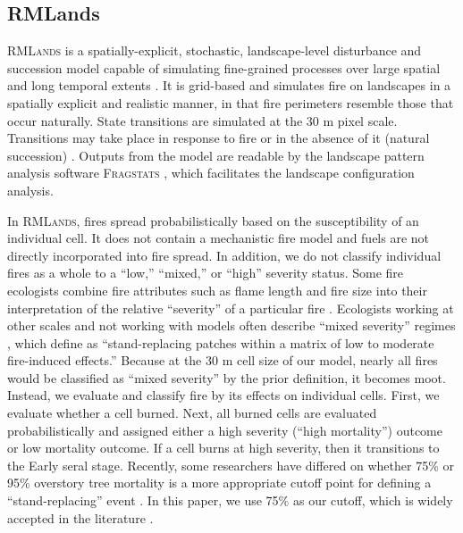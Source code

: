 \subsection{RMLands}

\textsc{RMLands} is a spatially-explicit, stochastic, landscape-level disturbance and succession model capable of simulating fine-grained processes over large spatial and long temporal extents \citep{McGarigal2005}. It is grid-based and simulates fire on landscapes in a spatially explicit and realistic manner, in that fire perimeters resemble those that occur naturally. State transitions are simulated at the 30 m pixel scale. Transitions may take place in response to fire or in the absence of it (natural succession) \citep{McGarigal2012}. Outputs from the model are readable by the landscape pattern analysis software \textsc{Fragstats} \citep{Fragstats2012}, which facilitates the landscape configuration analysis.

In \textsc{RMLands}, fires spread probabilistically based on the susceptibility of an individual cell. It does not contain a mechanistic fire model and fuels are not directly incorporated into fire spread. In addition, we do not classify individual fires as a whole to a ``low,'' ``mixed,'' or ``high'' severity status. Some fire ecologists combine fire attributes such as flame length and fire size into their interpretation of the relative ``severity'' of a particular fire \citep{Agee1993}.   Ecologists working at other scales and not working with models often describe ``mixed severity'' regimes \citep[e.g.,][]{Kane2013}, which \citet{Collins2010} define as ``stand-replacing patches within a matrix of low to moderate fire-induced effects.'' Because at the 30 m cell size of our model, nearly all fires would be classified as ``mixed severity'' by the prior definition, it becomes moot. Instead, we evaluate and classify fire by its effects on individual cells. First, we evaluate whether a cell burned. Next, all burned cells are evaluated probabilistically and assigned either a high severity (``high mortality'') outcome or low mortality outcome. If a cell burns at high severity, then it transitions to the Early seral stage. Recently, some researchers have differed on whether 75\% or 95\% overstory tree mortality is a more appropriate cutoff point for defining a ``stand-replacing'' event \citep{Fule2014,Mallek2013}. In this paper, we use 75\% as our cutoff, which is widely accepted in the literature \citep{Miller2009,Baker2014,Agee1993,Agee2007}.



